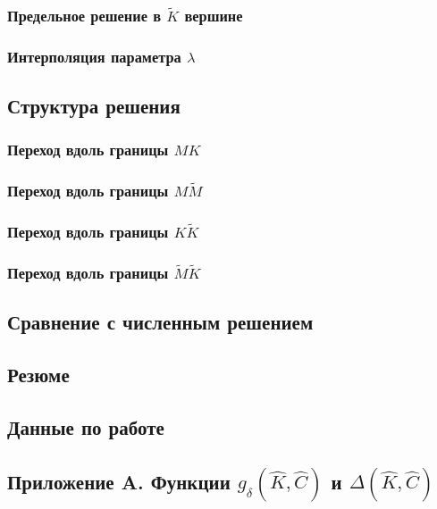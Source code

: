 \documentclass[main.tex]{subfiles}
\begin{document}
\subsubsection{Предельное решение в $\tilde{K}$ вершине}

\subsubsection{Интерполяция параметра $\lambda$}

\subsection{Структура решения}

\subsubsection{Переход вдоль границы $MK$}

\subsubsection{Переход вдоль границы $M\tilde{M}$}

\subsubsection{Переход вдоль границы $K\tilde{K}$}

\subsubsection{Переход вдоль границы $\tilde{M}\tilde{K}$}

\subsection{Сравнение с численным решением}

\subsection{Резюме}

\subsection{Данные по работе}

\subsection*{Приложение A. Функции $g_{\delta}\!\left(\hat{K},\hat{C}\right)$ и $\Delta\!\left(\hat{K},\hat{C}\right)$}
\end{document}
